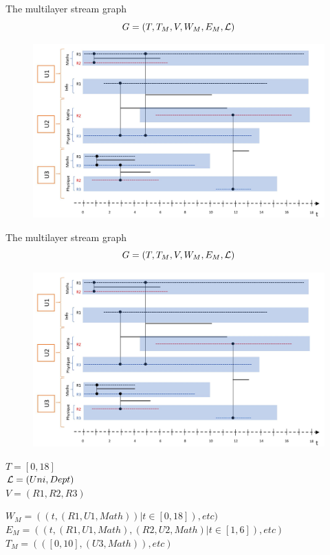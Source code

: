 \documentclass[15pt]{beamer}
\begin{document}
\begin{frame}{The multilayer stream graph}
\[
G=(T,T_M,V,W_M,E_M,\cal{L})
\]

\begin{figure}
    \centering
    \includegraphics[width=\linewidth]{img/chercheurs.jpg}
    \label{fig:chercheurs}
\end{figure}
\end{frame}

\begin{frame}{The multilayer stream graph}
\[
G=(T,T_M,V,W_M,E_M,\cal{L})
\]
\begin{minipage}{0.69\linewidth}
\begin{figure}
    \centering
    \includegraphics[width=\linewidth]{img/chercheurs.jpg}
    \label{fig:chercheurs}
\end{figure}
\end{minipage}
\begin{minipage}{0.3\textwidth}
\begin{footnotesize}
$T=[0,18]$\\
${\cal L} = (Uni,Dept)$\\
$V=(R1,R2,R3)$\\
\end{footnotesize}
\end{minipage}


$W_M = ((t,(R1,U1,Math))| t \in [0,18]), etc)$\\
$E_M= ((t,(R1,U1,Math),(R2,U2,Math)| t \in [1,6]), etc)$\\
$T_M= (([0,10],(U3,Math)),etc)$
\end{frame}
\end{document}
